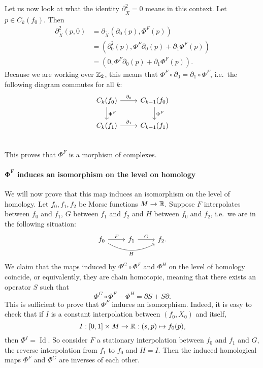 \begin{myproof}
Let us now look at what the identity $\partial_{\tilde{X}}^2 = 0$ means in this context. Let $p \in C_k(f_0)$.
Then
\begin{align*}
    \partial_{\tilde{X}}^2 (p, 0) &= \partial_{\tilde{X}}(\partial_{0}(p),  \Phi^{F}(p))\\
                                                      &= (\partial_0^2(p), \Phi^{F}\partial_0(p)+ \partial_1 \Phi^{F}(p))\\
                                                    &= (0, \Phi^{F}\partial_0(p)+ \partial_1 \Phi^{F}(p))
.\end{align*} 
Because we are working over $\mathbb{Z}_2$, this means that $\Phi^{F}  \circ  \partial_0 = \partial_1  \circ  \Phi^{F}$, i.e.\ the following diagram commutes for all $k$:
\[
    \begin{tikzcd}
        C_k(f_0) \arrow[d, "\Phi^{F}"]\arrow[r, "\partial_0"] &C_{k-1}(f_0) \arrow[d, "\Phi^{F}"]\\
        C_k(f_1) \arrow[r, "\partial_1"] &C_{k-1}(f_1)\\
    \end{tikzcd}
\]
This proves that $\Phi^{F}$ is a morphism of complexes.

\paragraph{$\bm{\Phi^{F}}$ induces an isomorphism on the level on homology}

We will now prove that this map induces an isomorphism on the level of homology.
Let $f_0, f_1, f_2$ be Morse functions $M \to  \mathbb{R}$.
Suppose $F$ interpolates between $f_0$ and $f_1$,
$G$ between $f_1$ and $f_2$ and $H$ between $f_0$ and $f_2$, i.e.\ we are in the following situation:
\[
    \begin{tikzcd}
        f_0 \arrow[rr, "H"', bend right] \arrow[r, "F"] &f_1 \arrow[r, "G"] &f_2.
    \end{tikzcd}
\]
We claim that the maps induced by $\Phi^{G} \circ \Phi^{F}$ and $\Phi^{H}$ on the level of homology coincide, or equivalently, they are chain homotopic, meaning that there exists an operator $S$ such that
 \[
\Phi^{G}  \circ  \Phi^{F} - \Phi^{H} = \partial S + S \partial
.\] 
This is sufficient to prove that $\Phi^{F}$ induces an isomorphism.
Indeed, it is easy to check that if $I$ is a constant interpolation between  $(f_0, X_0)$ and itself, 
\[
    I: [0,1] \times M \to  \mathbb{R}: (s, p) \mapsto f_0(p),
\] 
then $\Phi^{I} = \operatorname{Id}$.
So consider $F$ a stationary interpolation between $f_0$ and $f_1$ and $G$, the reverse interpolation from $f_1$ to $f_0$ and $H = I$. Then the induced homological maps $\Phi^{F}$ and $\Phi^{G}$ are inverses of each other.


\end{myproof}
